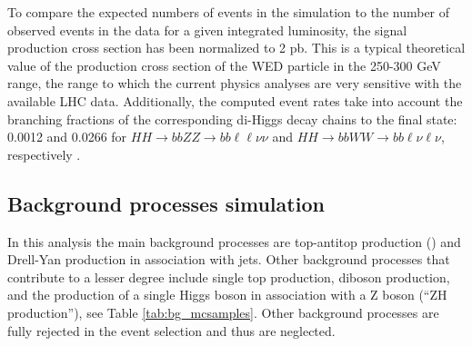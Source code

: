 To compare the expected numbers of events in the simulation to the number of observed events in the data for a given integrated luminosity, the signal production cross section has been normalized to 2 pb. This is a typical theoretical value of the production cross section of the WED particle in the 250-300 GeV range, the range to which the current physics analyses are very sensitive with the available LHC data. Additionally, the computed event rates take into account the branching fractions of the corresponding di-Higgs decay chains to the final state: 0.0012 and 0.0266 for $HH\to bbZZ\to bb\ell\ell\nu\nu$ and $HH\to bbWW\to bb\ell\nu\ell\nu$, respectively \cite{CERNYR4}.

\subsection{Background processes simulation\label{sec:bkgMC}}
In this analysis the main background processes are top-antitop production (\ttbar) and Drell-Yan production in association with jets. 
Other background processes that contribute to a lesser degree include single top production, diboson production, and the production of a single Higgs boson in association with a Z boson (``ZH production''), see Table \ref{tab:bg_mcsamples}. Other background processes are fully rejected in the event selection and thus are neglected. 

